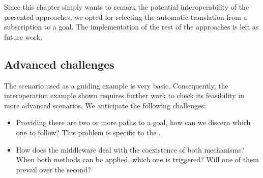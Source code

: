 Since this chapter simply wants to remark the potential interoperability of the presented approaches,
we opted for selecting the automatic translation from a subscription to a goal.
The implementation of the rest of the approaches is left as future work.



\subsection{Advanced challenges} %

The scenario used as a guiding example is very basic.
Consequently, the interoperation example shown requires further work to check its feasibility in more advanced scenarios.
We anticipate the following challenges:
\begin{itemize}
  \item Providing there are two or more paths to a goal, how can we discern which one to follow?
	This problem is specific to the \restActuation{}.
  \item How does the middleware deal with the coexistence of both mechanisms?
	When both methods can be applied, which one is triggered?
	Will one of them prevail over the second?
\end{itemize}